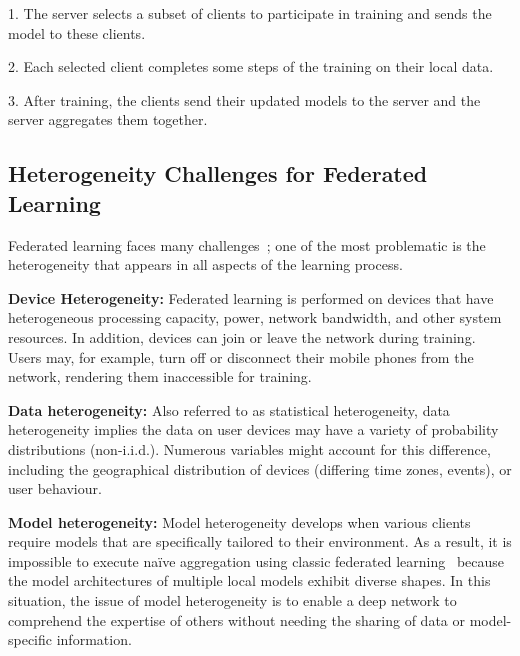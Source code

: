 \documentclass[withindex,glossary]{cam-thesis}
\begin{document}
1. The server selects a subset of clients to participate in training and sends the model to these clients.

2. Each selected client completes some steps of the training on their local data.

3. After training, the clients send their updated models to the server and the server aggregates them together.



\subsection{Heterogeneity Challenges for Federated Learning}
\label{sec:hetero_challenges}

Federated learning faces many challenges~\cite{li2020federated}; one of the most problematic is the heterogeneity that appears in all aspects of the learning process.

\textbf{Device Heterogeneity:} Federated learning is performed on devices that have heterogeneous processing capacity, power, network bandwidth, and other system resources. In addition, devices can join or leave the network during training. Users may, for example, turn off or disconnect their mobile phones from the network, rendering them inaccessible for training. 

\textbf{Data heterogeneity:} Also referred to as statistical heterogeneity, data heterogeneity implies the data on user devices may have a variety of probability distributions (non-i.i.d.). Numerous variables might account for this difference, including the geographical distribution of devices (differing time zones, events), or user behaviour. 

\textbf{Model heterogeneity:} Model heterogeneity develops when various clients require models that are specifically tailored to their environment.
As a result, it is impossible to execute naïve aggregation using classic federated learning~\cite{wu2020personalized} because the model architectures of multiple local models exhibit diverse shapes. In this situation, the issue of model heterogeneity is to enable a deep network to comprehend the expertise of others without needing the sharing of data or model-specific information.
\end{document}
